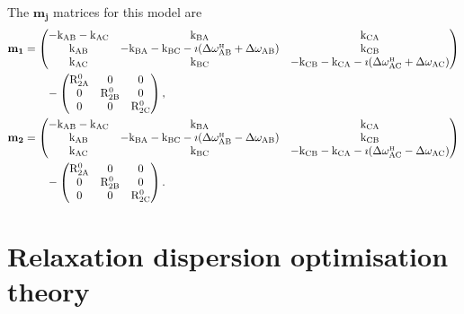 The $\mathbf{m_j}$ matrices for this model are
\begin{subequations}
\begin{align}
    \mathbf{m_1} &= \begin{pmatrix}
                        -\kAB -\kAC & \kBA                                  & \kCA \\
                        \kAB        & -\kBA -\kBC -\imath(\dwHAB + \dwAB)   & \kCB \\
                        \kAC        & \kBC                                  & -\kCB -\kCA -\imath(\dwHAC + \dwAC)
                    \end{pmatrix}  \nonumber \\
                 &\qquad - \begin{pmatrix}
                               \RtwozeroA & 0          & 0    \\
                               0          & \RtwozeroB & 0    \\
                               0          & 0          & \RtwozeroC
                           \end{pmatrix}, \\
    \mathbf{m_2} &= \begin{pmatrix}
                        -\kAB -\kAC & \kBA                                  & \kCA \\
                        \kAB        & -\kBA -\kBC -\imath(\dwHAB - \dwAB)   & \kCB \\
                        \kAC        & \kBC                                  & -\kCB -\kCA -\imath(\dwHAC - \dwAC)
                    \end{pmatrix}  \nonumber \\
                 &\qquad - \begin{pmatrix}
                               \RtwozeroA & 0          & 0    \\
                               0          & \RtwozeroB & 0    \\
                               0          & 0          & \RtwozeroC
                           \end{pmatrix}.
\end{align}
\end{subequations}




\section{Relaxation dispersion optimisation theory}

